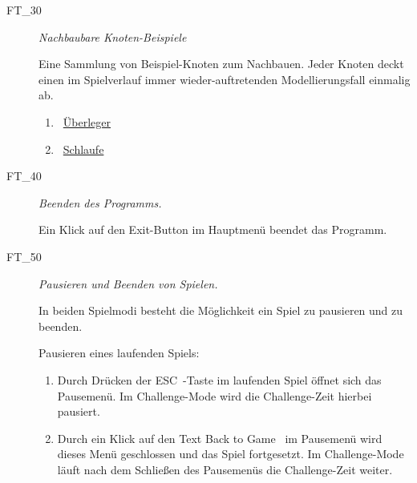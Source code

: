 \begin{description}
\begin{enumerate}
	\end{enumerate}
	
	
	\item[FT\_30] \textit{Nachbaubare Knoten-Beispiele} \hfill\\
	
	\label{FT:30}
	
	Eine Sammlung von Beispiel-Knoten zum Nachbauen. Jeder Knoten deckt einen im Spielverlauf immer wieder-auftretenden Modellierungsfall einmalig ab. 
	
	\begin{enumerate}
	
		\label{FT:30:Ueberleger}
		\item \mousecursor~\hyperref[Abb:Test-Knoten:Ueberleger]{\glqq Überleger\grqq}
		
		\label{FT:30:Schlaufe}
		\item \mousecursor~\hyperref[Abb:Test-Knoten:Schlaufe]{\glqq Schlaufe\grqq}
		~\\

	\end{enumerate}


	
	\item[FT\_40] \textit{Beenden des Programms.} \hfill\\
	
	\label{FT:40}
	
	Ein Klick auf den \glqq Exit\grqq-Button im Hauptmenü beendet das Programm.
	~\\



	\item[FT\_50] \textit{Pausieren und Beenden von Spielen.}  \hfill\\
	
	\label{FT:50}
	
	In beiden Spielmodi besteht die Möglichkeit ein Spiel zu pausieren und zu beenden.
	
	Pausieren eines laufenden Spiels:

	\begin{enumerate} 
	
		\item Durch Drücken der \glqq ESC\grqq~-Taste im laufenden Spiel öffnet sich das Pausemenü. Im Challenge-Mode wird die Challenge-Zeit hierbei pausiert.
		
		\item Durch ein Klick auf den Text \glqq Back to Game\grqq~ im Pausemenü wird dieses Menü geschlossen und das Spiel fortgesetzt. Im Challenge-Mode läuft nach dem Schließen des Pausemenüs die Challenge-Zeit weiter.
		

\end{enumerate}
\end{description}
